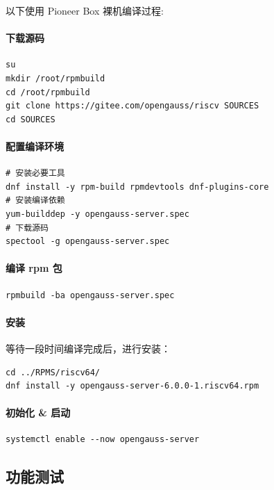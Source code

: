 \documentclass{article}
\begin{document}
以下使用 Pioneer Box 裸机编译过程:

\paragraph{下载源码}

\begin{verbatim}
su 
mkdir /root/rpmbuild
cd /root/rpmbuild
git clone https://gitee.com/opengauss/riscv SOURCES
cd SOURCES
\end{verbatim}

\paragraph{配置编译环境}

\begin{verbatim}
# 安装必要工具
dnf install -y rpm-build rpmdevtools dnf-plugins-core
# 安装编译依赖
yum-builddep -y opengauss-server.spec
# 下载源码
spectool -g opengauss-server.spec
\end{verbatim}

\paragraph{编译 rpm 包}

\begin{verbatim}
rpmbuild -ba opengauss-server.spec
\end{verbatim}

\paragraph{安装}

等待一段时间编译完成后，进行安装：

\begin{verbatim}
cd ../RPMS/riscv64/
dnf install -y opengauss-server-6.0.0-1.riscv64.rpm
\end{verbatim}

\paragraph{初始化 \& 启动}

\begin{verbatim}
systemctl enable --now opengauss-server
\end{verbatim}

\subsection{功能测试}
\end{document}
